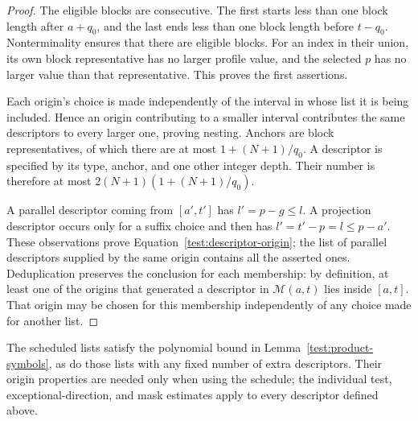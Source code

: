 \begin{proof}
The eligible blocks are consecutive. The first starts less than one
block length after $a+q_0$, and the last ends less than one block
length before $t-q_0$. Nonterminality ensures that there are eligible
blocks. For an index in their union, its own block representative has
no larger profile value, and the selected $p$ has no larger value
than that representative. This proves the first assertions.

Each origin's choice is made independently of the interval in whose
list it is being included. Hence an origin contributing to a
smaller interval contributes the same descriptors to every larger
one, proving nesting. Anchors are block representatives, of which
there are at most $1+(N+1)/q_0$. A descriptor is specified by its
type, anchor, and one other integer depth. Their number is therefore
at most $2(N+1)(1+(N+1)/q_0)$.

A parallel descriptor coming from $[a',t']$ has $l'=p-g\le l$.
A projection descriptor occurs only for a suffix choice and then has
$l'=t'-p=l\le p-a'$. These observations prove
Equation~\eqref{test:descriptor-origin}; the list of parallel
descriptors supplied by the same origin contains all the asserted
ones. Deduplication preserves the conclusion for each membership:
by definition, at least one of the origins that generated a descriptor
in $\mathcal M(a,t)$ lies inside $[a,t]$. That origin may be chosen for
this membership independently of any choice made for another list.
\end{proof}

The scheduled lists satisfy the polynomial bound in
Lemma~\ref{test:product-symbols}, as do those lists with any fixed number
of extra descriptors. Their origin properties are needed only when using
the schedule; the individual test, exceptional-direction, and mask
estimates apply to every descriptor defined above.

